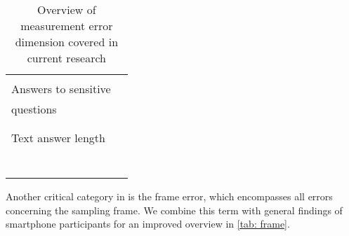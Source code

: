 \begin{table}
\begin{tabular}{ll}
    	& \cite{skeie_smartphone_2019}\\
    	Answers to sensitive & \cite{lee_experimental_2019}\\
    	questions & \cite{ mavletova_sensitive_2013}\\
    	& \cite{toninelli_smartphones_2016}\\
        & \cite{mavletova_data_2013, antoun_effects_2017}\\
    	Text answer length & \cite{wells_comparison_2014, mavletova_data_2013}\\
    	& \cite{antoun_effects_2017, lambert_living_2015}\\
    	& \cite{buskirk_making_2014}\\
    	& \cite{schlosser_mobile_2018}\\
    	& \cite{zou_mobile_2021, revilla_open_2016}\\
    	& \cite{toepoel_probing_2021, struminskaya_effects_2015}\\
    	& \cite{lugtig_use_2016}\\
    	& \cite{toepoel_what_2014}\\
    	\bottomrule
    \end{tabular}
    \caption{Overview of measurement error dimension covered in current research}
	\label{tab: measurement}
\end{table}


Another critical category in \cite{biemer_total_2010} is the frame error, which encompasses all errors concerning the sampling frame. We combine this term with general findings of smartphone participants for an improved overview in \ref{tab: frame}.

